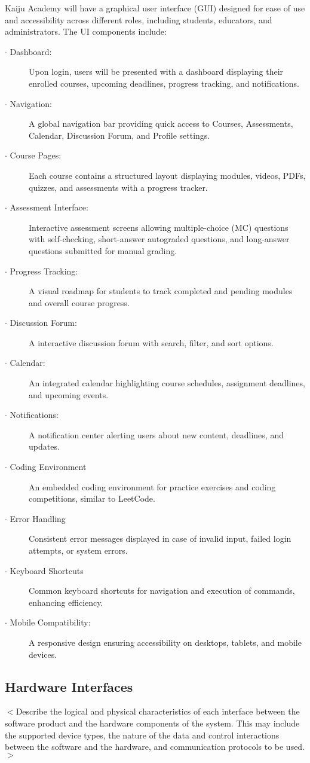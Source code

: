 \documentclass[a4paper, 11pt]{scrreprt}
\begin{document}
Kaiju Academy will have a graphical user interface (GUI) designed for ease of use and accessibility across different roles, including students, educators, and administrators. The UI components include:
\begin{description}
    \item[$\cdot$ Dashboard:] Upon login, users will be presented with a dashboard displaying their enrolled courses, upcoming deadlines, progress tracking, and notifications.
    \item[$\cdot$ Navigation:] A global navigation bar providing quick access to Courses, Assessments, Calendar, Discussion Forum, and Profile settings.
    \item[$\cdot$ Course Pages:] Each course contains a structured layout displaying modules, videos, PDFs, quizzes, and assessments with a progress tracker.
    \item[$\cdot$ Assessment Interface:] Interactive assessment screens allowing multiple-choice (MC) questions with self-checking, short-answer autograded questions, and long-answer questions submitted for manual grading.
    \item[$\cdot$ Progress Tracking:] A visual roadmap for students to track completed and pending modules and overall course progress.
    \item[$\cdot$ Discussion Forum:] A interactive discussion forum with search, filter, and sort options.
    \item[$\cdot$ Calendar:] An integrated calendar highlighting course schedules, assignment deadlines, and upcoming events.
    \item[$\cdot$ Notifications:] A notification center alerting users about new content, deadlines, and updates.
    \item[$\cdot$ Coding Environment] An embedded coding environment for practice exercises and coding competitions, similar to LeetCode.
    \item[$\cdot$ Error Handling] Consistent error messages displayed in case of invalid input, failed login attempts, or system errors.
    \item[$\cdot$ Keyboard Shortcuts] Common keyboard shortcuts for navigation and execution of commands, enhancing efficiency.
    \item[$\cdot$ Mobile Compatibility:] A responsive design ensuring accessibility on desktops, tablets, and mobile devices.
\end{description}

\subsection{Hardware Interfaces}
$<$Describe the logical and physical characteristics of each interface between 
the software product and the hardware components of the system. This may include 
the supported device types, the nature of the data and control interactions 
between the software and the hardware, and communication protocols to be 
used.$>$
\end{document}
